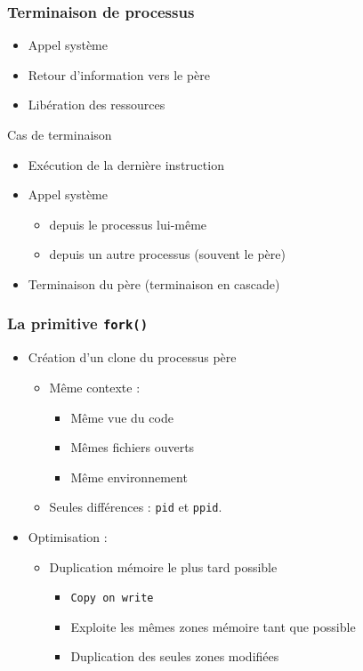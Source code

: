 \begin{frame}
\frametitle{Terminaison de processus}
\begin{itemize}
\item Appel système
\item Retour d’information vers le père
\item Libération des ressources
\end{itemize}
\begin{block}{Cas de terminaison}
\begin{itemize}
\item Exécution de la dernière instruction
\item Appel système
\begin{itemize}
\item depuis le processus lui-même
\item depuis un autre processus (souvent le père)
\end{itemize}
\item Terminaison du père (terminaison en cascade)
\end{itemize}
\end{block}
\end{frame}


\begin{frame}
\frametitle{La primitive \texttt{fork()}}
\begin{itemize}
\item <1> Création d’un clone du processus père
\begin{itemize}
\item Même contexte :
\begin{itemize}
\item Même vue du code
\item Mêmes fichiers ouverts
\item Même environnement
\end{itemize}
\item Seules différences : \texttt{pid} et \texttt{ppid}.
\end{itemize}
\item <2> Optimisation :
\begin{itemize}
\item Duplication mémoire le plus tard possible
\begin{itemize}
\item \texttt{Copy on write}
\item Exploite les mêmes zones mémoire tant que possible
\item Duplication des seules zones modifiées
\end{itemize}
\end{itemize}
\end{itemize}
\end{frame}

